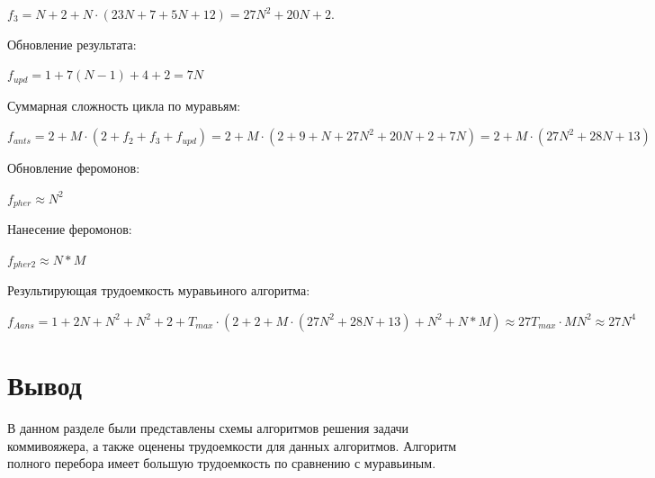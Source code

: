 $f_{3} = N + 2 + N \cdot (23N + 7 + 5N + 12) = 27N^2 + 20N + 2$.

Обновление результата:

$f_{upd} = 1 + 7(N-1) + 4 + 2 = 7N$

Суммарная сложность цикла по муравьям:

$f_{ants} = 2 + M \cdot (2 + f_{2} + f_{3} + f_{upd}) = 2 + M \cdot (2 + 9 + N + 27N^2 + 20N + 2 + 7N) = 2 + M \cdot (27N^2 + 28N + 13)$

Обновление феромонов:

$f_{pher} \approx N^2$

Нанесение феромонов:

$f_{pher2} \approx N * M$

Результирующая трудоемкость муравьиного алгоритма:

$f_{Aans} = 1 + 2N + N^2 + N^2 + 2 + T_{max} \cdot (2 + 2 + M \cdot(27N^2 + 28N + 13) + N^2 + N*M) \approx 27T_{max} \cdot MN^2 \approx 27N^4$

\section*{Вывод}
В данном разделе были представлены схемы алгоритмов решения задачи коммивояжера, а также оценены трудоемкости для данных алгоритмов.
Алгоритм полного перебора имеет большую трудоемкость по сравнению с муравьиным.


